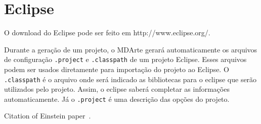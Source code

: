 \section{Eclipse}

O download do Eclipse pode ser feito em http://www.eclipse.org/. 

Durante a geração de um projeto, o MDArte gerará automaticamente os arquivos de configuração \texttt{.project} e \texttt{.classpath} de um projeto Eclipse. Esses arquivos podem ser usados diretamente para importação do projeto ao Eclipse. O \texttt{.classpath} é o arquivo onde será indicado as bibliotecas para o eclipse que serão utilizados pelo projeto. Assim, o eclipse saberá completar as informações automaticamente. Já o \texttt{.project} é uma descrição das opções do projeto.

Citation of Einstein paper~\cite{Einstein}.